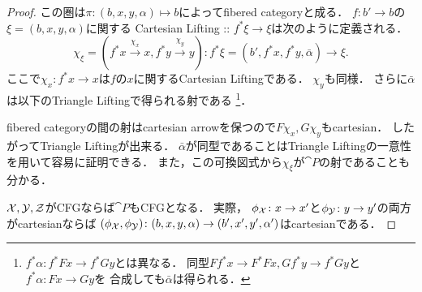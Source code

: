 \begin{proof}
    この圏は$\pi \colon (b,x,y,\alpha) \mapsto b$によってfibered categoryと成る．
    $f \colon b' \to b$の$\xi=(b, x, y, \alpha)$に関する
    Cartesian Lifting :: $f^*\xi \to \xi$は次のように定義される．
    \[
        \chi_{\xi}=(f^*x \xrightarrow{\chi_x} x, f^*y \xrightarrow{\chi_y} y)
        \colon
        f^*\xi=(b', f^*x, f^*y, \bar{\alpha}) \to \xi.
    \]
    ここで$\chi_x \colon f^*x \to x$は$f$の$x$に関するCartesian Liftingである．
    $\chi_y$も同様．
    さらに$\bar{\alpha}$は以下のTriangle Liftingで得られる射である
    \footnote
    {
        $f^*\alpha \colon f^*Fx \to f^*Gy$とは異なる．
        同型$Ff^*x \to F^*Fx, Gf^*y \to f^*Gy$と$f^*\alpha \colon Fx \to Gy$を
        合成しても$\bar{\alpha}$は得られる．
    }．
    \begin{center}
    \end{center}
    fibered categoryの間の射はcartesian arrowを保つので$F\chi_x, G\chi_y$もcartesian．
    したがってTriangle Liftingが出来る．
    $\bar{\alpha}$が同型であることはTriangle Liftingの一意性を用いて容易に証明できる．
    また，この可換図式から$\chi_{\xi}$が$\cat{P}$の射であることも分かる．

    $\mathcal{X}, \mathcal{Y}, \mathcal{Z}$がCFGならば$\cat{P}$もCFGとなる．
    実際，
    $\phi_{\mathcal{X}} \colon x \to x'$と$\phi_{\mathcal{Y}} \colon y \to y'$の両方がcartesianならば
    $(\phi_{\mathcal{X}}, \phi_{\mathcal{Y}}) \colon (b, x, y, \alpha) \to (b', x', y', \alpha')$はcartesianである．


\end{proof}
